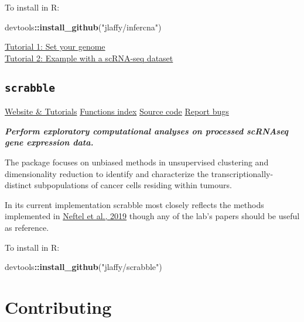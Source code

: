 \documentclass[]{book}
\newenvironment{Shaded}{\begin{snugshade}}{\end{snugshade}}
\newcommand{\KeywordTok}[1]{\textcolor[rgb]{0.13,0.29,0.53}{\textbf{#1}}}
\newcommand{\StringTok}[1]{\textcolor[rgb]{0.31,0.60,0.02}{#1}}
\newcommand{\OperatorTok}[1]{\textcolor[rgb]{0.81,0.36,0.00}{\textbf{#1}}}
\newcommand{\NormalTok}[1]{#1}
\begin{document}
To install in R:

\begin{Shaded}
\begin{Highlighting}[]
\NormalTok{devtools}\OperatorTok{::}\KeywordTok{install_github}\NormalTok{(}\StringTok{"jlaffy/infercna"}\NormalTok{)}
\end{Highlighting}
\end{Shaded}

\href{https://jlaffy.github.io/infercna/articles/useGenome.html}{Tutorial
1: Set your genome}\\
\href{https://jlaffy.github.io/infercna/articles/infercna_tutorial.html}{Tutorial
2: Example with a scRNA-seq dataset}

\subsection{\texorpdfstring{\texttt{scrabble}}{scrabble}}\label{scrabble}

\href{https://jlaffy.github.io/scrabble}{Website \& Tutorials}
\textbar{}
\href{https://jlaffy.github.io/scrabble/reference/index.html}{Functions
index} \textbar{} \href{https://github.com/jlaffy/scrabble}{Source code}
\textbar{} \href{https://github.com/jlaffy/scrabble/issues}{Report bugs}

\emph{\textbf{Perform exploratory computational analyses on processed
scRNAseq gene expression data.}}

The package focuses on unbiased methods in unsupervised clustering and
dimensionality reduction to identify and characterize the
transcriptionally-distinct subpopulations of cancer cells residing
within tumours.

In its current implementation scrabble most closely reflects the methods
implemented in
\href{https://www.ncbi.nlm.nih.gov/pubmed/31327527}{Neftel et al., 2019}
though any of the lab's papers should be useful as reference.

To install in R:

\begin{Shaded}
\begin{Highlighting}[]
\NormalTok{devtools}\OperatorTok{::}\KeywordTok{install_github}\NormalTok{(}\StringTok{"jlaffy/scrabble"}\NormalTok{)}
\end{Highlighting}
\end{Shaded}

\section{Contributing}\label{contributing}
\end{document}

